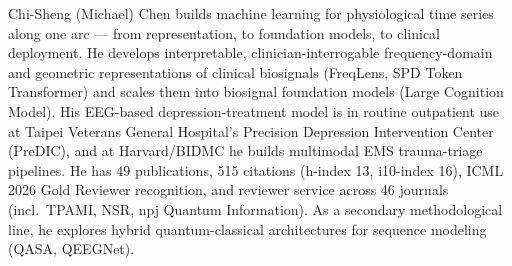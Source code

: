 \documentclass[letterpaper,10pt]{article}
\newif\ifindustry
\begin{document}

\ifindustry
Research engineer building LLM-agent systems and time-series/multimodal models, with an emphasis on verifiable evaluation. Building an ASR $\rightarrow$ LLM-agent $\rightarrow$ prediction pipeline on an EMS database of 4M+ patient records at Harvard/BIDMC; 3rd place (Healthcare Agent track) at Berkeley RDI AgentX-AgentBeats 2026, 1,300+ teams overall; led LLM token-efficiency research for a quant-trading firm; EEG treatment-response model in routine clinical use. 49 publications, 515 citations; ICML Gold Reviewer.
\else
Chi-Sheng (Michael) Chen builds machine learning for physiological time series along one arc --- from representation, to foundation models, to clinical deployment. He develops interpretable, clinician-interrogable frequency-domain and geometric representations of clinical biosignals (FreqLens, SPD Token Transformer) and scales them into biosignal foundation models (Large Cognition Model). His EEG-based depression-treatment model is in routine outpatient use at Taipei Veterans General Hospital's Precision Depression Intervention Center (PreDIC), and at Harvard/BIDMC he builds multimodal EMS trauma-triage pipelines. He has 49 publications, 515 citations (h-index 13, i10-index 16), ICML 2026 Gold Reviewer recognition, and reviewer service across 46 journals (incl.\ TPAMI, NSR, npj Quantum Information). As a secondary methodological line, he explores hybrid quantum-classical architectures for sequence modeling (QASA, QEEGNet).
\fi
\end{document}
